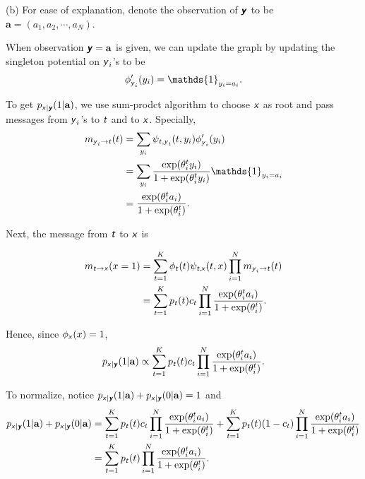 \documentclass{article}
\newcommand{\s}[1]{\textsf{\textit{#1}}}
\begin{document}
%
\noindent
(b) 
For ease of explanation, denote the observation of $\s{\textbf{y}}$ to be $\textbf{a} = (a_1, a_2, \cdots, a_N)$.

%
When observation $\s{\textbf{y}} = \textbf{a}$ is given, we can update the graph by updating the singleton
potential on $\s{y}_i$'s to be
\begin{equation*}
	\phi'_{\s{y}_i}(y_i) = \mathds{1}_{y_i = a_i}.
\end{equation*}

To get $p_{\s{x}|\s{\textbf{y}}}(1|\textbf{a})$, we use sum-prodct algorithm to choose $\s{x}$ as root and pass
messages from $\s{y}_i$'s to $\s{t}$ and to $\s{x}$. Specially,
%
\begin{align*}
	m_{\s{y}_i\to\s{t}}(t) &= \sum_{y_i} \psi_{\s{t},\s{y}_i}(t, y_i) \phi'_{\s{y}_i}(y_i)\\
	&=\sum_{y_i} \frac{\exp(\theta^t_iy_i)}{1 + \exp(\theta^t_iy_i)} \mathds{1}_{y_i = a_i}\\
	&=\frac{\exp(\theta^t_i a_i)}{1 + \exp(\theta^t_i)}.
\end{align*}

Next, the message from $\s{t}$ to $\s{x}$ is

\begin{align*}
	m_{\s{t}\to\s{x}}(x=1) &= \sum_{t=1}^K \phi_{\s{t}}(t) \psi_{\s{t,x}}(t, x) \prod_{i=1}^{N} m_{\s{y}_i\to\s{t}}(t)\\
	&=\sum_{t=1}^K p_{\s{t}}(t)c_t\prod_{i=1}^{N}\frac{\exp(\theta^t_i a_i)}{1 + \exp(\theta^t_i)}.
\end{align*}
%

Hence, since $\phi_{\s{x}}(x)=1$,
\begin{align*}
p_{\s{x}|\s{\textbf{y}}}(1|\textbf{a}) \propto \sum_{t=1}^K p_{\s{t}}(t)c_t\prod_{i=1}^{N}\frac{\exp(\theta^t_i a_i)}{1 + \exp(\theta^t_i)}.
\end{align*}

To normalize, notice $p_{\s{x}|\s{\textbf{y}}}(1|\textbf{a}) + p_{\s{x}|\s{\textbf{y}}}(0|\textbf{a}) = 1$ and 
\begin{align*}
p_{\s{x}|\s{\textbf{y}}}(1|\textbf{a}) + p_{\s{x}|\s{\textbf{y}}}(0|\textbf{a}) &= 
\sum_{t=1}^K p_{\s{t}}(t)c_t\prod_{i=1}^{N}\frac{\exp(\theta^t_i a_i)}{1 + \exp(\theta^t_i)} + 
\sum_{t=1}^K p_{\s{t}}(t)(1 - c_t)\prod_{i=1}^{N}\frac{\exp(\theta^t_i a_i)}{1 + \exp(\theta^t_i)} \\
&= \sum_{t=1}^K p_{\s{t}}(t)\prod_{i=1}^{N}\frac{\exp(\theta^t_i a_i)}{1 + \exp(\theta^t_i)}.
\end{align*}
\end{document}
